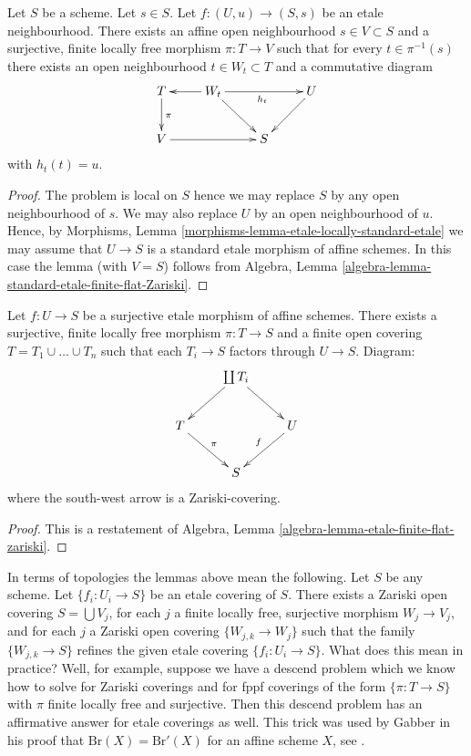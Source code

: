 \begin{lemma}
\label{lemma-dominate-etale-neighbourhood-finite-flat}
Let $S$ be a scheme. Let $s \in S$.
Let $f : (U, u) \to (S, s)$ be an etale neighbourhood.
There exists an affine open neighbourhood $s \in V \subset S$
and a surjective, finite locally free morphism $\pi : T \to V$
such that for every $t \in \pi^{-1}(s)$ there exists an
open neighbourhood $t \in W_t \subset T$ and a commutative
diagram
$$
\xymatrix{
T \ar[d]^\pi & W_t \ar[l] \ar[rr]_{h_t} \ar[rd] & & U \ar[dl] \\
V \ar[rr] & & S
}
$$
with $h_t(t) = u$.
\end{lemma}

\begin{proof}
The problem is local on $S$ hence we may replace $S$ by any
open neighbourhood of $s$.
We may also replace $U$ by an open neighbourhood of $u$.
Hence, by Morphisms, Lemma \ref{morphisms-lemma-etale-locally-standard-etale}
we may assume that
$U \to S$ is a standard etale morphism of affine schemes.
In this case the lemma (with $V = S$) follows from
Algebra, Lemma \ref{algebra-lemma-standard-etale-finite-flat-Zariski}.
\end{proof}

\begin{lemma}
\label{lemma-dominate-etale-affine-finite-flat}
Let $f : U \to S$ be a surjective etale morphism of affine schemes.
There exists a surjective, finite locally free morphism
$\pi : T \to S$ and a finite open covering
$T = T_1 \cup \ldots \cup T_n$ such that each
$T_i \to S$ factors through $U \to S$. Diagram:
$$
\xymatrix{
& \coprod T_i  \ar[rd] \ar[ld] & \\
T \ar[rd]^\pi & & U \ar[ld]_f \\
& S &
}
$$
where the south-west arrow is a Zariski-covering.
\end{lemma}

\begin{proof}
This is a restatement of
Algebra, Lemma \ref{algebra-lemma-etale-finite-flat-zariski}.
\end{proof}

\begin{remark}
\label{remark-topologies}
In terms of topologies the lemmas above mean the following.
Let $S$ be any scheme. Let $\{f_i : U_i \to S\}$ be an etale covering
of $S$. There exists a Zariski open covering $S = \bigcup V_j$,
for each $j$ a finite locally free, surjective morphism
$W_j \to V_j$, and for each $j$ a Zariski open covering
$\{W_{j, k} \to W_j\}$ such that the family
$\{W_{j, k} \to S\}$ refines the given etale covering
$\{f_i : U_i \to S\}$. What does this mean in practice?
Well, for example, suppose we have a descend problem which we
know how to solve for Zariski coverings and for fppf coverings
of the form $\{\pi : T \to S\}$ with $\pi$ finite locally free
and surjective. Then this descend problem has an affirmative
answer for etale coverings as well. This trick was used by
Gabber in his proof that $\text{Br}(X) = \text{Br}'(X)$
for an affine scheme $X$, see \cite{Hoobler}.
\end{remark}

